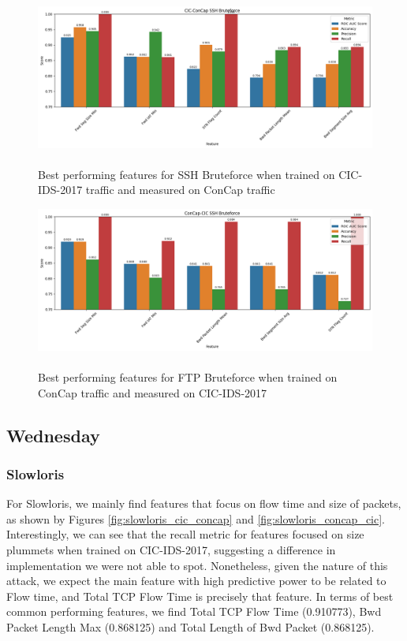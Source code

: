 \begin{figure}
	\centering
	\includegraphics[width=1.2\linewidth]{images/ssh_cic_concap}
	\caption{\\Best performing features for SSH Bruteforce when trained on CIC-IDS-2017 traffic and measured on ConCap traffic}
	\label{fig:ssh_cic_concap}
\end{figure}

\begin{figure}
	\centering
	\includegraphics[width=1.2\linewidth]{images/ssh_concap_cic}
	\caption{\\Best performing features for FTP Bruteforce when trained on ConCap traffic and measured on CIC-IDS-2017}
	\label{fig:ssh_concap_cic}
\end{figure}

\FloatBarrier

\subsection{Wednesday}
\subsubsection{Slowloris}
For Slowloris, we mainly find features that focus on flow time and size of packets, as shown by Figures \ref{fig:slowloris_cic_concap} and \ref{fig:slowloris_concap_cic}. Interestingly, we can see that the recall metric for features focused on size plummets when trained on CIC-IDS-2017, suggesting a difference in implementation we were not able to spot. Nonetheless, given the nature of this attack, we expect the main feature with high predictive power to be related to Flow time, and Total TCP Flow Time is precisely that feature. In terms of best common performing features, we find Total TCP Flow Time (0.910773), Bwd Packet Length Max (0.868125) and Total Length of Bwd Packet (0.868125). 

